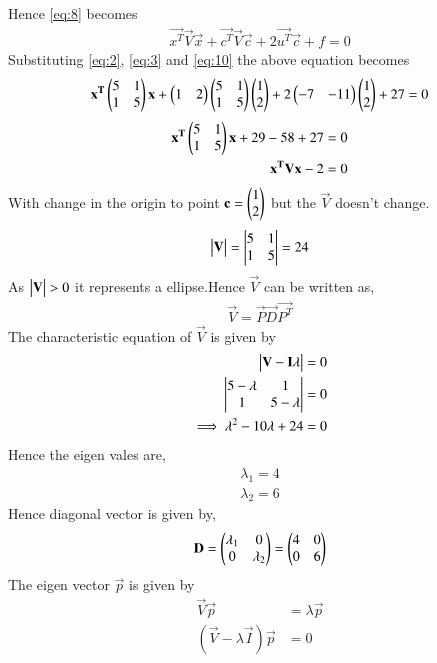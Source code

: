\documentclass[journal,12pt,twocolumn]{IEEEtran}
\begin{document}
Hence \eqref{eq:8} becomes
\begin{align}
\vec{x^T}\vec{V}\vec{x}+\vec{c^T}\vec{V}\vec{c}+2\vec{u^T}\vec{c}+f = 0 \label{eq:11}
\end{align}
Substituting \eqref{eq:2}, \eqref{eq:3} and \eqref{eq:10} the above equation becomes
\begin{align}
\mathbf{x^T}\begin{pmatrix}5&1\\1&5\end{pmatrix}\mathbf{x}+\begin{pmatrix}1&2\end{pmatrix}\begin{pmatrix}5&1\\1&5\end{pmatrix}\begin{pmatrix}1\\2\end{pmatrix}+2\begin{pmatrix}-7&-11\end{pmatrix}\begin{pmatrix}1\\2\end{pmatrix}+27 = 0
\end{align}
\begin{align}
\mathbf{x^T}\begin{pmatrix}5&1\\1&5\end{pmatrix}\mathbf{x}+29-58+27=0\\
\mathbf{x^T}\mathbf{V}\mathbf{x}-2 = 0\label{eq:12}
\end{align}
With change in the origin to point $\mathbf{c}=\begin{pmatrix}1\\2\end{pmatrix}$ but the $\vec{V}$ doesn't change.
\begin{align}
\begin{vmatrix}\mathbf{V}\end{vmatrix} = \begin{vmatrix}5&1\\1&5\end{vmatrix} = 24
\end{align}
As $\begin{vmatrix}\mathbf{V}\end{vmatrix} >0$ it represents a ellipse.Hence $\vec{V}$ can be written as,
\begin{align}
\vec{V}=\vec{P}\vec{D}\vec{P^T}\label{eq:13}
\end{align}
 The characteristic equation of $\vec{V}$ is given by
\begin{align}
\begin{vmatrix}\mathbf{V}-\mathbf{I}\lambda\end{vmatrix} = 0\\
\begin{vmatrix}5-\lambda & 1\\1& 5-\lambda\end{vmatrix} =0\\
\implies \lambda^2 - 10\lambda+24 = 0
\end{align}
Hence the eigen vales are,
\begin{align}
\lambda_1 = 4\\
\lambda_2 = 6
\end{align}
Hence diagonal vector is given by,
\begin{align}
\mathbf{D}= \begin{pmatrix}\lambda_1&0\\0&\lambda_2\end{pmatrix} = \begin{pmatrix}4&0\\0&6\end{pmatrix}\label{eq:14}
\end{align}
The eigen vector $\vec{p}$ is given by
\begin{align}
    \vec{V}\vec{p}&=\lambda\vec{p}\\
    (\vec{V}-\lambda\vec{I})\vec{p}&=0
\end{align}
\end{document}
